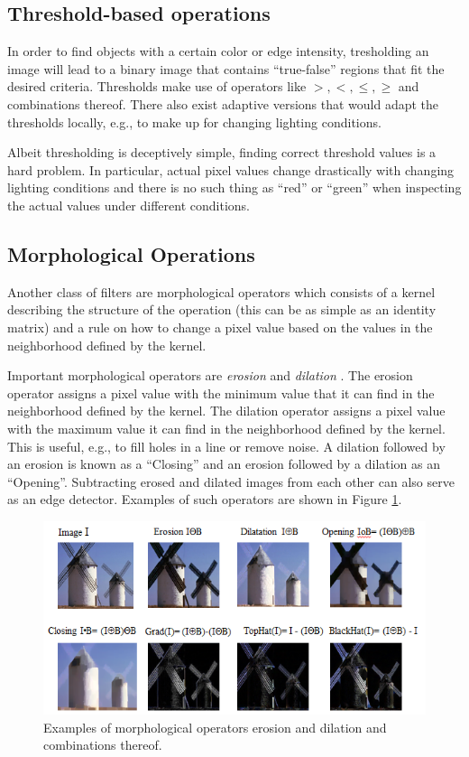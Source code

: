 \subsection{Threshold-based operations}
In order to find objects with a certain color or edge intensity, tresholding an image will lead to a binary image that contains ``true-false'' regions that fit the desired criteria. Thresholds make use of operators like $>,<,\leq,\geq$ and combinations thereof. There also exist adaptive versions that would adapt the thresholds locally, e.g., to make up for changing lighting conditions.

Albeit thresholding is deceptively simple, finding correct threshold values is a hard problem. In particular, actual pixel values change drastically with changing lighting conditions and there is no such thing as ``red'' or ``green'' when inspecting the actual values under different conditions. 

\subsection{Morphological Operations}
Another class of filters are morphological operators which consists of a kernel describing the structure of the operation (this can be as simple as an identity matrix) and a rule on how to change a pixel value based on the values in the neighborhood defined by the kernel.

Important morphological operators are \emph{erosion} and \emph{dilation} . The erosion operator assigns a pixel value with the minimum value that it can find in the neighborhood defined by the kernel. The dilation operator assigns a pixel value with the maximum value it can find in the neighborhood defined by the kernel. This is useful, e.g., to fill holes in a line or remove noise. A dilation followed by an erosion is known as a ``Closing'' and an erosion followed by a dilation as an ``Opening''. Subtracting erosed and dilated images from each other can also serve as an edge detector. Examples of such operators are shown in Figure \ref{fig:morphology}.

\begin{figure}
	\centering
		\includegraphics[width=\textwidth]{figs/morphology}
	\caption{Examples of morphological operators erosion and dilation and combinations thereof.
	\label{fig:morphology}}
\end{figure}


